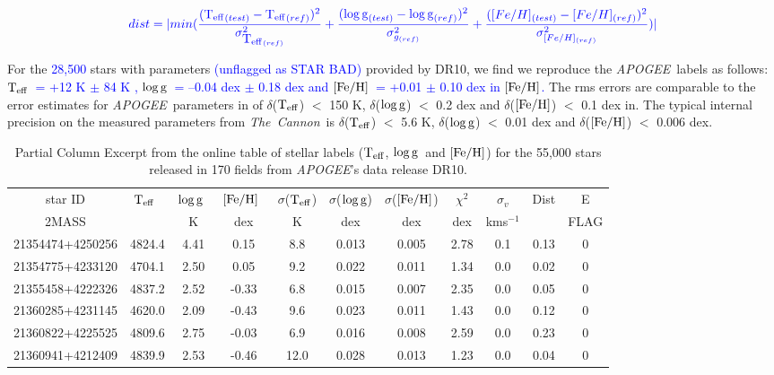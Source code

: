 \documentclass[12pt, preprint]{aastex}
\newcommand{\tc}{\textsl{The~Cannon}}
\newcommand{\apogee}{\textsl{APOGEE}}
\newcommand{\teff}{\mbox{$\rm T_{eff}$}}
\newcommand{\feh}{\mbox{$\rm [Fe/H]$}}
\newcommand{\logg}{\mbox{$\rm \log g$}}
\begin{document}
\begin{equation}
\textcolor{blue}{dist = |min(\frac{(\teff_{(test)} - \teff_{(ref)})^2}{\sigma^2_{\teff_{(ref)}}} + \frac{(\logg_{(test)} - \logg_{(ref)})^2}{\sigma^2_{g_{(ref)}}} + \frac{([Fe/H]_{(test)} - [Fe/H]_{(ref)})^2}{\sigma^2_{[Fe/H]_{(ref)}}})|}
\end{equation}


For the \textcolor{blue}{28,500} stars with parameters \textcolor{blue}{(unflagged as STAR BAD)} provided by DR10, we find we reproduce the \apogee\ labels as follows: 
\textcolor{blue}{\teff\ = +12 K $\pm$ 84 K , \logg\ = --0.04 dex $\pm$ 0.18 dex and \feh\ = +0.01 $\pm$ 0.10 dex in \feh. }
The rms errors are comparable to the error estimates for \apogee\ parameters in \citet{Meszaros2013} 
of $\delta$(\teff) $<$ 150 K, $\delta$(\logg) $<$ 0.2 dex and $\delta$(\feh) $<$ 0.1 dex in. 
The typical internal precision on the measured parameters from \tc\ is $\delta$(\teff) $<$ 5.6 K, $\delta$(\logg) $<$ 0.01 dex and $\delta$(\feh) $<$ 0.006 dex.

\begin{table}[!h]
\tiny{
\centering
\caption{Partial Column Excerpt from the online table of stellar labels (\teff, \logg\ and \feh) for the 55,000 stars released in 170 fields from \apogee 's data release DR10. } 
\begin{tabular}{| c | c | c |  c | c | c |  c | c | c | c | c | } %
\hline
\tiny{star ID}  & \teff\ & \logg\ & \feh\ & $\sigma$(\teff) & $\sigma$(\logg) & $\sigma$(\feh) & $\chi^2$ & \tiny{$\sigma_{v}$} & Dist & \tiny{E} \\
\tiny{2MASS} &  & K &  dex  & K & dex & dex & dex & kms$^{-1}$  & &  \tiny{FLAG}  \\    
\hline
\tiny{21354474+4250256} & 4824.4 & 4.41  & 0.15  & 8.8  & 0.013  & 0.005  & 2.78  & 0.1 & 0.13 & 0 \\
\tiny{21354775+4233120} & 4704.1  & 2.50  & 0.05  & 9.2  & 0.022  & 0.011  & 1.34  & 0.0  & 0.02 & 0\\
\tiny{21355458+4222326} & 4837.2  & 2.52  & -0.33 &  6.8 &  0.015 &  0.007 &  2.35  & 0.0 &  0.05 & 0\\
\tiny{21360285+4231145} & 4620.0  & 2.09  & -0.43 &  9.6 &  0.023 &  0.011 &  1.43  & 0.0 & 0.12 & 0 \\
\tiny{21360822+4225525} & 4809.6  & 2.75  & -0.03 &  6.9 &  0.016 &  0.008 &  2.59  & 0.0 & 0.23 & 0\\
\tiny{21360941+4212409} & 4839.9  & 2.53 & -0.46  & 12.0 &  0.028 &  0.013 &  1.23  & 0.0 &  0.04 & 0 \\
 \hline
\end{tabular}
\label{tab:online} }
\end{table}  
 
\end{document}
